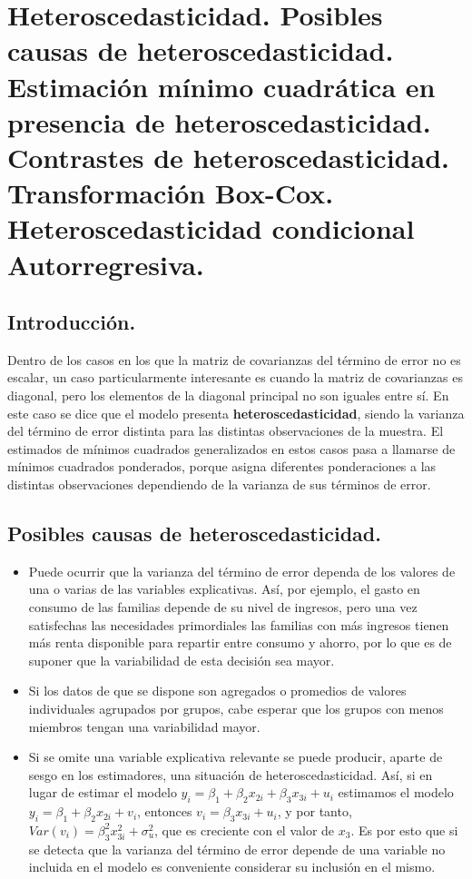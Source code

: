 
\chapter{Heteroscedasticidad. Posibles causas de heteroscedasticidad. Estimaci\'on
m\'inimo cuadr\'atica en presencia de heteroscedasticidad. Contrastes
de heteroscedasticidad. Transformaci\'on Box-Cox. Heteroscedasticidad
condicional Autorregresiva.}


\section{Introducci\'on.}

Dentro de los casos en los que la matriz de covarianzas del t\'ermino
de error no es escalar, un caso particularmente interesante es cuando
la matriz de covarianzas es diagonal, pero los elementos de la diagonal
principal no son iguales entre s\'i. En este caso se dice que el modelo
presenta \textbf{heteroscedasticidad}, siendo la varianza del t\'ermino
de error distinta para las distintas observaciones de la muestra.
El estimados de m\'inimos cuadrados generalizados en estos casos pasa
a llamarse de m\'inimos cuadrados ponderados, porque asigna diferentes
ponderaciones a las distintas observaciones dependiendo de la varianza
de sus t\'erminos de error.


\section{Posibles causas de heteroscedasticidad.}
\begin{itemize}
\item Puede ocurrir que la varianza del t\'ermino de error dependa de los
valores de una o varias de las variables explicativas. As\'i, por ejemplo,
el gasto en consumo de las familias depende de su nivel de ingresos,
pero una vez satisfechas las necesidades primordiales las familias
con m\'as ingresos tienen m\'as renta disponible para repartir entre consumo
y ahorro, por lo que es de suponer que la variabilidad de esta decisi\'on
sea mayor.
\item Si los datos de que se dispone son agregados o promedios de valores
individuales agrupados por grupos, cabe esperar que los grupos con
menos miembros tengan una variabilidad mayor.
\item Si se omite una variable explicativa relevante se puede producir,
aparte de sesgo en los estimadores, una situaci\'on de heteroscedasticidad.
As\'i, si en lugar de estimar el modelo $y_{i}=\beta_{1}+\beta_{2}x_{2i}+\beta_{3}x_{3i}+u_{i}$
estimamos el modelo $y_{i}=\beta_{1}+\beta_{2}x_{2i}+v_{i}$, entonces
$v_{i}=\beta_{3}x_{3i}+u_{i}$, y por tanto, $Var\left(v_{i}\right)=\beta_{3}^{2}x_{3i}^{2}+\sigma_{u}^{2}$,
que es creciente con el valor de $x_{3}$. Es por esto que si se detecta
que la varianza del t\'ermino de error depende de una variable no incluida
en el modelo es conveniente considerar su inclusi\'on en el mismo.
\end{itemize}

